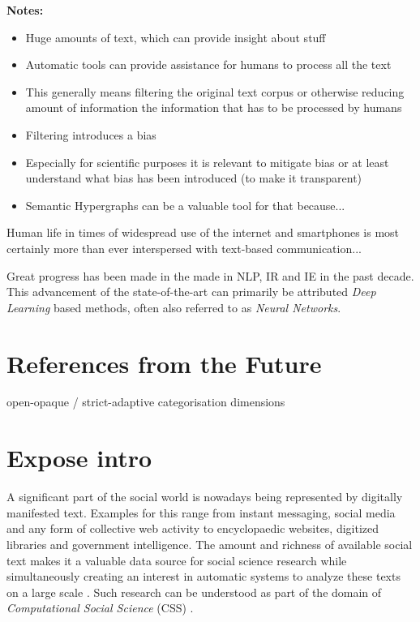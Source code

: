 \documentclass[11pt]{scrreprt}
\let\cite\parencite  %
\begin{document}
\textbf{Notes:}
\begin{itemize}
	\item Huge amounts of text, which can provide insight about stuff
	\item Automatic tools can provide assistance for humans to process all the text
	\item This generally means filtering the original text corpus or otherwise reducing amount of information the information that has to be processed by humans
	\item Filtering introduces a bias
	\item Especially for scientific purposes it is relevant to mitigate bias or at least understand what bias has been introduced (to make it transparent)
	\item Semantic Hypergraphs can be a valuable tool for that because...
\end{itemize}


Human life in times of widespread use of the internet and smartphones is most certainly more than ever interspersed with text-based communication...

Great progress has been made in the made in NLP, IR and IE in the past decade. This advancement of the state-of-the-art can primarily be attributed \textit{Deep Learning} based methods, often also referred to as \textit{Neural Networks}. \cite{youngRecentTrendsDeep2018, minRecentAdvancesNatural2023, hirschbergAdvancesNaturalLanguage2015}

\section{References from the Future}
open-opaque / strict-adaptive categorisation dimensions

\section{Expose intro}

A significant part of the social world is nowadays being represented by digitally manifested text. Examples for this range from instant messaging, social media and any form of collective web activity to encyclopaedic websites, digitized libraries and government intelligence. The amount and richness of available social text makes it a valuable data source for social science research while simultaneously creating an interest in automatic systems to analyze these texts on a large scale \cite{evansMachineTranslationMining2016}. Such research can be understood as part of the domain of \textit{Computational Social Science} (CSS) \cite{lazerComputationalSocialScience2009}.
\end{document}
